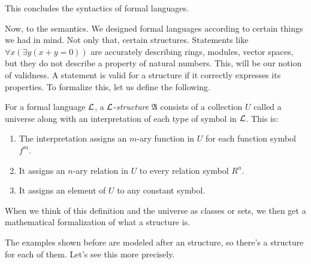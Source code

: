 This concludes the syntactics of formal languages.

Now, to the semantics. We designed formal languages according to certain things we had in mind. Not only that, certain structures. Statements like $\forall x (\exists y( x + y = 0))$ are accurately describing rings, modules, vector spaces, but they do not describe a property of natural numbers. This, will be our notion of validness. A statement is valid for a structure if it correctly expresses its properties. To formalize this, let us define the following.

\begin{dfn}
	For a formal language $\mathcal{L}$, a $\mathcal{L}$-\textit{structure} $\mathfrak{A}$ consists of a collection $U$ called a universe along with an interpretation of each type of symbol in $\mathcal{L}$. This is:
	\begin{enumerate}
		\item The interpretation assigns an $m$-ary function in $U$ for each function symbol $f^{m}$.
		\item It assigns an $n$-ary relation in $U$ to every relation symbol $R^{n}$.
		\item It assigns an element of $U$ to any constant symbol.
	\end{enumerate}

	When we think of this definition and the universe as classes or sets, we then get a mathematical formalization of what a structure is.
\end{dfn}

The examples shown before are modeled after an structure, so there's a structure for each of them. Let's see this more precisely.

